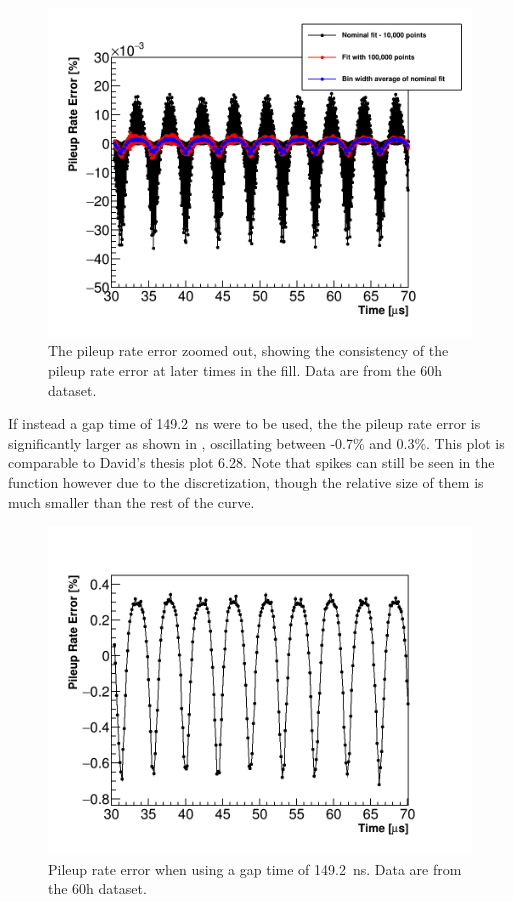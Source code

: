 \begin{figure}
    \centering
    \includegraphics[width=.8\textwidth]{PileupRateError_ZoomedOut}
    \caption[]{The pileup rate error zoomed out, showing the consistency of the pileup rate error at later times in the fill. Data are from the 60h dataset.}
    \label{fig:pileupRateErrorZoomed}
\end{figure}

If instead a gap time of \SI{149.2}{\ns} were to be used, the the pileup rate error is significantly larger as shown in , oscillating between -0.7\% and 0.3\%. This plot is comparable to David's thesis plot 6.28. Note that spikes can still be seen in the function however due to the discretization, though the relative size of them is much smaller than the rest of the curve.


\begin{figure}
    \centering
    \includegraphics[width=.8\textwidth]{PileupRateError_149p2SGT}
    \caption[]{Pileup rate error when using a gap time of \SI{149.2}{\ns}. Data are from the 60h dataset.}
    \label{fig:pileupRateErrorLarger}
\end{figure}




